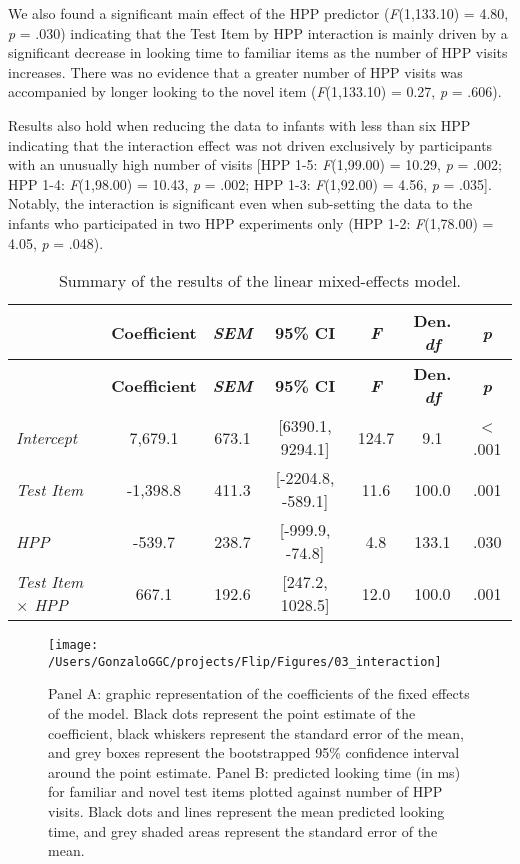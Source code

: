 \documentclass[english,man,man,floatsintext]{apa6}
\begin{document}
We also found a significant main effect of the HPP predictor (\emph{F}(1,133.10) = 4.80, \emph{p} = .030) indicating that the Test Item by HPP interaction is mainly driven by a significant decrease in looking time to familiar items as the number of HPP visits increases. There was no evidence that a greater number of HPP visits was accompanied by longer looking to the novel item (\emph{F}(1,133.10) = 0.27, \emph{p} = .606).

Results also hold when reducing the data to infants with less than six HPP indicating that the interaction effect was not driven exclusively by participants with an unusually high number of visits {[}HPP 1-5: \emph{F}(1,99.00) = 10.29, \emph{p} = .002; HPP 1-4: \emph{F}(1,98.00) = 10.43, \emph{p} = .002; HPP 1-3: \emph{F}(1,92.00) = 4.56, \emph{p} = .035{]}. Notably, the interaction is significant even when sub-setting the data to the infants who participated in two HPP experiments only (HPP 1-2: \emph{F}(1,78.00) = 4.05, \emph{p} = .048).

\begin{longtable}[]{@{}lcccccc@{}}
\caption{\label{tab:tab1}Summary of the results of the linear mixed-effects model.}\tabularnewline
\toprule
& \textbf{Coefficient} & \textbf{\emph{SEM}} & \textbf{95\% CI} & \textbf{\emph{F}} & \textbf{Den. \emph{df}} & \textbf{\emph{p}}\tabularnewline
\midrule
\endfirsthead
\toprule
& \textbf{Coefficient} & \textbf{\emph{SEM}} & \textbf{95\% CI} & \textbf{\emph{F}} & \textbf{Den. \emph{df}} & \textbf{\emph{p}}\tabularnewline
\midrule
\endhead
\emph{Intercept} & 7,679.1 & 673.1 & {[}6390.1, 9294.1{]} & 124.7 & 9.1 & \textless{} .001\tabularnewline
\emph{Test Item} & -1,398.8 & 411.3 & {[}-2204.8, -589.1{]} & 11.6 & 100.0 & .001\tabularnewline
\emph{HPP} & -539.7 & 238.7 & {[}-999.9, -74.8{]} & 4.8 & 133.1 & .030\tabularnewline
\emph{Test Item \(\times\) HPP} & 667.1 & 192.6 & {[}247.2, 1028.5{]} & 12.0 & 100.0 & .001\tabularnewline
\bottomrule
\end{longtable}

\begin{figure}
\texttt{[image: /Users/GonzaloGGC/projects/Flip/Figures/03\_interaction]} \caption{Panel A: graphic representation of the coefficients of the fixed effects of the model. Black dots represent the point estimate of the coefficient, black whiskers represent the standard error of the mean, and grey boxes represent the bootstrapped 95\% confidence interval around the point estimate. Panel B: predicted looking time (in ms) for familiar and novel test items plotted against number of HPP visits. Black dots and lines represent the mean predicted looking time, and grey shaded areas represent the standard error of the mean.}\label{fig:fig2}
\end{figure}
\end{document}

